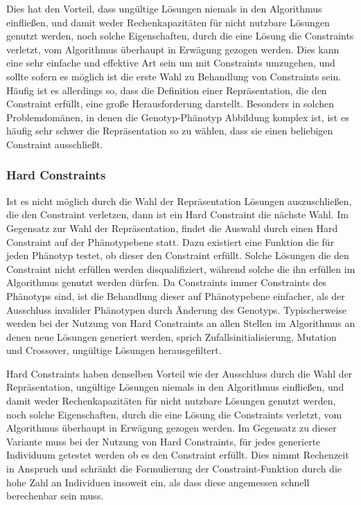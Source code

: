 Dies hat den Vorteil, dass ungültige Lösungen niemals in den Algorithmus einfließen, und damit weder Rechenkapazitäten für nicht nutzbare Lösungen genutzt werden, noch solche Eigenschaften, durch die eine Lösung die Constraints verletzt, vom Algorithmus überhaupt in Erwägung gezogen werden.
Dies kann eine sehr einfache und effektive Art sein um mit Constraints umzugehen, und sollte sofern es möglich ist die erste Wahl zu Behandlung von Constraints sein.
Häufig ist es allerdings so, dass die Definition einer Repräsentation, die den Constraint erfüllt, eine große Herausforderung darstellt.
Besonders in solchen Problemdomänen, in denen die Genotyp-Phänotyp Abbildung komplex ist, ist es häufig sehr schwer die Repräsentation so zu wählen, dass sie einen beliebigen Constraint ausschließt.

\subsubsection{Hard Constraints}

Ist es nicht möglich durch die Wahl der Repräsentation Lösungen auszuschließen, die den Constraint verletzen, dann ist ein Hard Constraint die nächste Wahl.
Im Gegensatz zur Wahl der Repräsentation, findet die Auswahl durch einen Hard Constraint auf der Phänotypebene statt.
Dazu existiert eine Funktion die für jeden Phänotyp testet, ob dieser den Constraint erfüllt.
Solche Lösungen die den Constraint nicht erfüllen werden disqualifiziert, während solche die ihn erfüllen im Algorithmus genutzt werden dürfen.
Da Constraints immer Constraints des Phänotyps sind, ist die Behandlung dieser auf Phänotypebene einfacher, als der Ausschluss invalider Phänotypen durch Änderung des Genotyps.
Typischerweise werden bei der Nutzung von Hard Constraints an allen Stellen im Algorithmus an denen neue Lösungen generiert werden, sprich Zufallsinitialisierung, Mutation und Crossover, ungültige Lösungen herausgefiltert.

Hard Constraints haben denselben Vorteil wie der Ausschluss durch die Wahl der Repräsentation, ungültige Lösungen niemals in den Algorithmus einfließen, und damit weder Rechenkapazitäten für nicht nutzbare Lösungen genutzt werden, noch solche Eigenschaften, durch die eine Lösung die Constraints verletzt, vom Algorithmus überhaupt in Erwägung gezogen werden.
Im Gegensatz zu dieser Variante muss bei der Nutzung von Hard Constraints, für jedes generierte Individuum getestet werden ob es den Constraint erfüllt.
Dies nimmt Rechenzeit in Anspruch und schränkt die Formulierung der Constraint-Funktion durch die hohe Zahl an Individuen insoweit ein, als dass diese angemessen schnell berechenbar sein muss.



